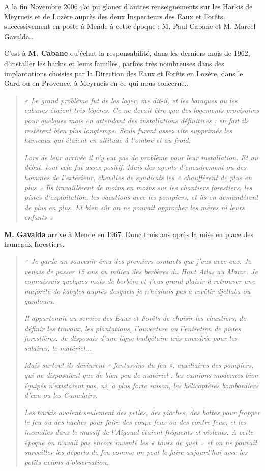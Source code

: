 A la fin Novembre 2006 j’ai pu glaner d’autres renseignements sur les Harkis de
Meyrueis et de Lozère auprès des deux Inspecteurs des Eaux et Forêts, successivement
en poste à Mende à cette époque : M. Paul Cabane et M. Marcel Gavalda..

C’est à \textbf{M. Cabane} qu’échut la responsabilité, dans les derniers mois de
1962, d’installer les harkis et leurs familles, parfois très nombreuses dans des
implantations choisies par la Direction des Eaux et Forêts en Lozère, dans le Gard ou
en Provence, à Meyrueis en ce qui nous concerne..

\begin{quote}
\textit{« Le grand problème fut de les loger, me dit-il, et les baraques ou les cabanes
étaient très légères. Ce ne devait être que des logements provisoires pour quelques
mois en attendant des installations définitives : en fait ils restèrent bien plus
longtemps. Seuls furent assez vite supprimés les hameaux qui étaient en altitude à
l’ombre et au froid.}

\textit{Lors de leur arrivée il n’y eut pas de problème pour leur installation. Et au début,
tout cela fut assez positif. Mais des agents d’encadrement ou des hommes de
l’extérieur, chevilles de syndicats les « chauffèrent de plus en plus » Ils travaillèrent
de moins en moins sur les chantiers forestiers, les pistes d’exploitation, les vacations
avec les pompiers, et ils en demandèrent de plus en plus. Et bien sûr on ne pouvait
approcher les mères ni leurs enfants »}
\end{quote}

\textbf{M. Gavalda} arrive à Mende en 1967. Donc trois ans après la mise en place des
hameaux forestiers.

\begin{quote}
\textit{« Je garde un souvenir ému des premiers contacts que j’eus avec eux. Je venais de
passer 15 ans au milieu des berbères du Haut Atlas au Maroc. Je connaissais
quelques mots de berbère et j’eus grand plaisir à retrouver une majorité de kabyles
auprès desquels je n’hésitais pas à revêtir djellaba ou gandoura.}

\textit{Il appartenait au service des Eaux et Forêts de choisir les chantiers, de définir les
travaux, les plantations, l’ouverture ou l’entretien de pistes forestières. Je disposais
d’une ligne budgétaire très encadrée pour les salaires, le matériel...}

\textit{Mais surtout ils devinrent « fantassins du feu », auxiliaires des pompiers, qui ne
disposaient que de bien peu de matériel : les camions modernes bien équipés
n’existaient pas, ni, à plus forte raison, les hélicoptères bombardiers d’eau ou les
Canadairs.}

\textit{Les harkis avaient seulement des pelles, des pioches, des battes pour frapper le feu
ou des haches pour faire des coupe-feux ou des contre-feux, et les incendies dans le
massif de l’Aigoual étaient fréquents et violents. A cette époque on n’avait pas
encore inventé les « tours de guet » et on ne pouvait surveiller les départs de feu
comme on peut le faire aujourd’hui avec les petits avions d’observation.}
\end{quote}

